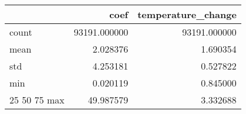 \begin{tabular}{lrr}
\toprule
 & coef & temperature_change \\
\midrule
count & 93191.000000 & 93191.000000 \\
mean & 2.028376 & 1.690354 \\
std & 4.253181 & 0.527822 \\
min & 0.020119 & 0.845000 \\
25%
50%
75%
max & 49.987579 & 3.332688 \\
\bottomrule
\end{tabular}
